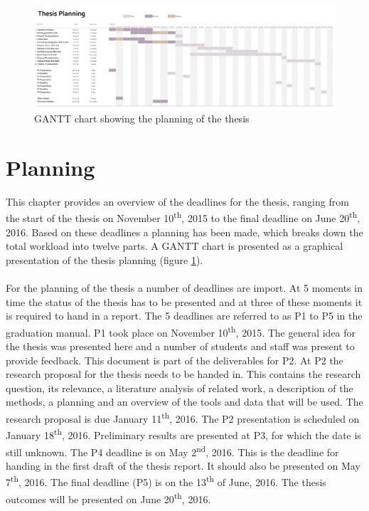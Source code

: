 

\begin{figure}
	\centering
	\includegraphics[width=1.5\linewidth, angle=90]{figs/GANTT-chart.png}
	\caption{GANTT chart showing the planning of the thesis}
	\label{fig:GANTT}
\end{figure}

\section{Planning}
\label{chap:planning}

This chapter provides an overview of the deadlines for the thesis, ranging from the start of the thesis on November 10\textsuperscript{th}, 2015 to the final deadline on June 20\textsuperscript{th}, 2016. Based on these deadlines a planning has been made, which breaks down the total workload into twelve parts. A GANTT chart is presented as a graphical presentation of the thesis planning (figure \ref{fig:GANTT}). \\ \mbox{} \\
For the planning of the thesis a number of deadlines are import. At 5 moments in time the status of the thesis has to be presented and at three of these moments it is required to hand in a report. The 5 deadlines are referred to as P1 to P5 in the graduation manual. P1 took place on November 10\textsuperscript{th}, 2015. The general idea for the thesis was presented here and a number of students and staff was present to provide feedback. This document is part of the deliverables for P2. At P2 the research proposal for the thesis needs to be handed in. This contains the research question, its relevance, a literature analysis of related work, a description of the methods, a planning and an overview of the tools and data that will be used. The research proposal is due January 11\textsuperscript{th}, 2016. The P2 presentation is scheduled on January 18\textsuperscript{th}, 2016. Preliminary results are presented at P3, for which the date is still unknown. The P4 deadline is on May 2\textsuperscript{nd}, 2016. This is the deadline for handing in the first draft of the thesis report. It should also be presented on May 7\textsuperscript{th}, 2016. The final deadline (P5) is on the 13\textsuperscript{th} of June, 2016. The thesis outcomes will be presented on June 20\textsuperscript{th}, 2016.

